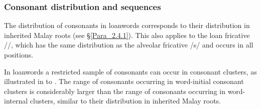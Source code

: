 \subsubsection[Consonant distribution and sequences]{Consonant distribution and sequences}\label{Para_2.5.3.1}
 

The distribution of consonants in loanwords corresponds to their distribution in inherited Malay roots (see §\ref{Para_2.4.1}). This also applies to the loan fricative //, which has the same distribution as the alveolar fricative /s/ and occurs in all positions.


In loanwords a restricted sample of consonants can occur in consonant clusters, as illustrated in  to . The range of consonants occurring in word-initial consonant clusters is considerably larger than the range of consonants occurring in word-internal clusters, similar to their distribution in inherited Malay roots.

